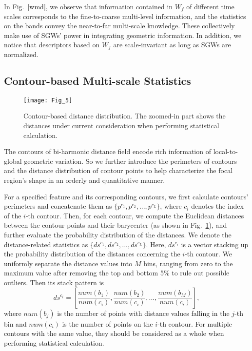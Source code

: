 In Fig.~\ref{wmd}, we observe that information contained in $W_f$ of
different time scales corresponds to the fine-to-coarse multi-level
information, and the statistics on the bands convey the near-to-far
multi-scale knowledge. These collectively make use of SGWs' power in
integrating geometric information. In addition, we notice that
descriptors based on $W_f$ are scale-invariant as long as SGWs are
normalized.

\subsection{Contour-based Multi-scale Statistics}

\begin{figure}[!to]
\begin{center}
\texttt{[image: Fig\_5]}
\end{center}
\caption[Contour-based distance distribution.]
  {Contour-based distance distribution. The zoomed-in part
  shows the distances under current consideration when performing
  statistical calculation.}
\label{Descriptor}
\end{figure}

The contours of bi-harmonic distance field encode rich information of
local-to-global geometric variation. So we further introduce the
perimeters of contours and the distance distribution of contour points
to help characterize the focal region's shape in an orderly and
quantitative manner.

For a specified feature and its corresponding contours, we first
calculate contours' perimeters and concatenate them as
$\{p^{c_1},p^{c_2},...,p^{c_L} \}$, where $c_i$ denotes the index of
the $i$-th contour. Then, for each contour, we compute the Euclidean
distances between the contour points and their barycenter (as shown in
Fig.~\ref{Descriptor}), and further evaluate the probability
distribution of the distances. We denote the distance-related
statistics as $\{ds^{c_1},ds^{c_2},...,ds^{c_L} \}$. Here, $ds^{c_i}$
is a vector stacking up the probability distribution of the distances
concerning the $i$-th contour. We uniformly separate the distance
values into $M$ bins, ranging from zero to the maximum value after
removing the top and bottom 5\% to rule out possible outliers. Then
its stack pattern is
\begin{equation}
  ds^{c_i}=[\frac{num(b_1)}{num(c_i)},\frac{num(b_2)}{num(c_i)},...,\frac{num(b_M)}{num(c_i)}],
\end{equation}
where $num(b_j)$ is the number of points with distance values falling
in the $j$-th bin and $num(c_i)$ is the number of points on the $i$-th
contour. For multiple contours with the same value, they should be
considered as a whole when performing statistical calculation.

